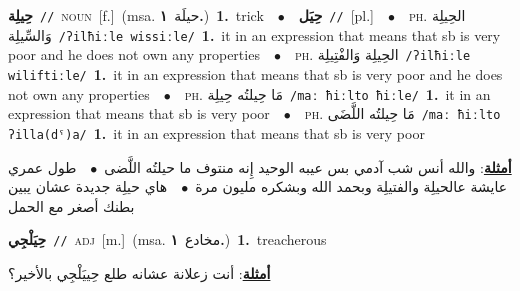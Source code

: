\documentclass[10pt,a4paper,twoside]{article} %
\begin{document}
\begin{multicols}{2}
{\setlength\topsep{0pt}\textbf{\foreignlanguage{arabic}{حِيلِة}}\ {\color{gray}\texttt{//}\color{black}}\ \textsc{noun}\ [f.]\ \color{gray}(msa. \foreignlanguage{arabic}{حيلَة}~\foreignlanguage{arabic}{\textbf{١.}})\color{black}\ \textbf{1.}~trick\ \ $\bullet$\ \ \setlength\topsep{0pt}\textbf{\foreignlanguage{arabic}{حِيَل}}\ {\color{gray}\texttt{//}\color{black}}\ [pl.]\ \ $\bullet$\ \ \textsc{ph.} \color{gray} \foreignlanguage{arabic}{الحِيلِة وَالسِّيلِة}\color{black}\ {\color{gray}\texttt{/{\sffamily ʔilħiːle wissiːle}/}\color{black}}\ \textbf{1.}~it in an expression that means that sb is very poor and he does not own any properties\ \ $\bullet$\ \ \textsc{ph.} \color{gray} \foreignlanguage{arabic}{الحِيلِة وَالفْتِيلِة}\color{black}\ {\color{gray}\texttt{/{\sffamily ʔilħiːle wiliftiːle}/}\color{black}}\ \textbf{1.}~it in an expression that means that sb is very poor and he does not own any properties\ \ $\bullet$\ \ \textsc{ph.} \color{gray} \foreignlanguage{arabic}{مَا حِيلتُه حِيلِة}\color{black}\ {\color{gray}\texttt{/{\sffamily maː ħiːlto ħiːle}/}\color{black}}\ \textbf{1.}~it in an expression that means that sb is very poor\ \ $\bullet$\ \ \textsc{ph.} \color{gray} \foreignlanguage{arabic}{مَا حِيلتُه اللَّضَى}\color{black}\ {\color{gray}\texttt{/{\sffamily maː ħiːlto ʔilla(dˤ)a}/}\color{black}}\ \textbf{1.}~it in an expression that means that sb is very poor\  \begin{flushright}\color{gray}\foreignlanguage{arabic}{\textbf{\underline{\foreignlanguage{arabic}{أمثلة}}}: والله أنس شب آدمي بس عيبه الوحيد إِنه منتوف ما حيلتُه اللَّضى\ $\bullet$\ \  طول عمري عايشة عالحيلِة والفتيلِة وبحمد الله وبشكره مليون مرة\ $\bullet$\ \  هاي حيلِة جديدة عشان يبين بطنك أصغر مع الحمل}\end{flushright}\color{black}} \vspace{2mm}

{\setlength\topsep{0pt}\textbf{\foreignlanguage{arabic}{حِيَلْجِي}}\ {\color{gray}\texttt{//}\color{black}}\ \textsc{adj}\ [m.]\ \color{gray}(msa. \foreignlanguage{arabic}{مخادع}~\foreignlanguage{arabic}{\textbf{١.}})\color{black}\ \textbf{1.}~treacherous\  \begin{flushright}\color{gray}\foreignlanguage{arabic}{\textbf{\underline{\foreignlanguage{arabic}{أمثلة}}}: أنت زعلانة عشانه طلع حِييَلْجِي بالأخير؟}\end{flushright}\color{black}} \vspace{2mm}


\end{multicols}
\end{document}
